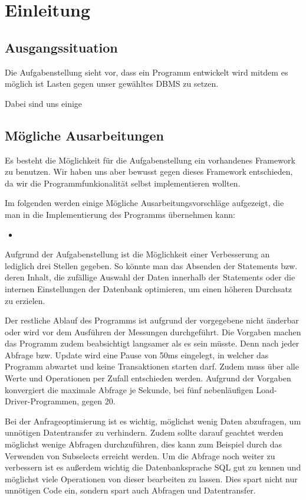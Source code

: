 \section{Einleitung}
\subsection{Ausgangssituation}

Die Aufgabenstellung sieht vor, dass ein Programm entwickelt wird mitdem es
möglich ist Lasten gegen unser gewähltes DBMS zu setzen. 

Dabei sind uns einige 

\subsection{Mögliche Ausarbeitungen}

Es besteht die Möglichkeit für die Aufgabenstellung ein vorhandenes Framework zu
benutzen. Wir haben uns aber bewusst gegen dieses Framework entschieden, da wir
die Programmfunkionalität selbst implementieren wollten.

Im folgenden werden einige Mögliche Ausarbeitungsvorschläge aufgezeigt, die man
in die Implementierung des Programms übernehmen kann:

\begin{itemize}
  \item 
\end{itemize}

Aufgrund der Aufgabenstellung ist die Möglichkeit einer Verbesserung an
lediglich drei Stellen gegeben. So könnte man das Absenden der Statements bzw.
deren Inhalt, die zufällige Auswahl der Daten innerhalb der Statements oder die
internen Einstellungen der Datenbank optimieren, um einen höheren Durchsatz zu
erzielen.

Der restliche Ablauf des Programms ist aufgrund der vorgegebene 
nicht änderbar oder wird vor dem Ausführen der Messungen durchgeführt. Die Vorgaben machen das
Programm zudem beabsichtigt langsamer als es sein müsste. Denn nach jeder
Abfrage bzw. Update wird eine Pause von 50ms eingelegt, in welcher das Programm
abwartet und keine Transaktionen starten darf. Zudem muss über alle Werte und
Operationen per Zufall entschieden werden. Aufgrund der Vorgaben konvergiert
die maximale Abfrage je Sekunde, bei fünf nebenläufigen Load-Driver-Programmen,
gegen 20.

Bei der Anfrageoptimierung ist es wichtig, möglichst wenig Daten abzufragen, um
unnötigen Datentransfer zu verhindern. Zudem sollte darauf geachtet werden
möglichst wenige Abfragen durchzuführen, dies kann zum Beispiel durch das
Verwenden von Subselects erreicht werden. Um die Abfrage noch weiter zu
verbessern ist es außerdem wichtig die Datenbanksprache SQL gut zu kennen und
möglichst viele Operationen von dieser bearbeiten zu lassen. Dies spart nicht
nur unnötigen Code ein, sondern spart auch Abfragen und Datentransfer.

